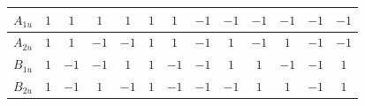 \documentclass[11pt]{easymemo}
\begin{document}
\begin{landscape}
\begin{table}
\begin{center}
\begin{tabular}{ccccccccccccc}
        $A_{1u}^{}$ & $1$                           & $1$                           & $1$                           & $1$                           & $1$                           & $1$                           & $-1$                          & $-1$                          & $-1$                          & $-1$                          & $-1$                          & $-1$                          \\ \hline

        $A_{2u}^{}$ & $1$                           & $1$                           & $-1$                          & $-1$                          & $1$                           & $1$                           & $-1$                          & $1$                           & $-1$                          & $1$                           & $-1$                          & $-1$                          \\ \hline

        $B_{1u}^{}$ & $1$                           & $-1$                          & $-1$                          & $1$                           & $1$                           & $-1$                          & $-1$                          & $1$                           & $1$                           & $-1$                          & $-1$                          & $1$                           \\ \hline

        $B_{2u}^{}$ & $1$                           & $-1$                          & $1$                           & $-1$                          & $1$                           & $-1$                          & $-1$                          & $-1$                          & $1$                           & $1$                           & $-1$                          & $1$                           \\ \hline


\end{tabular}
\end{center}
\end{table}
\end{landscape}
\end{document}
